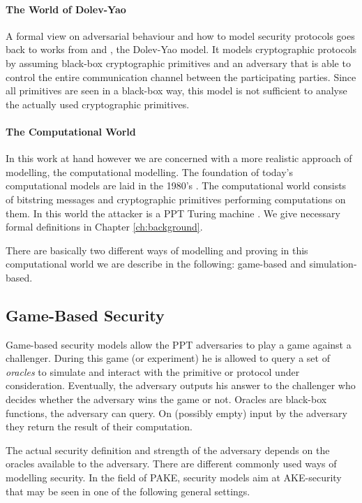 \paragraph{The World of Dolev-Yao}
A formal view on adversarial behaviour and how to model security protocols goes back to works from \citeauthor{Needham78} \citeyear{Needham78} \cite{Needham78} and \citeauthor{Dolev83} \citeyear{Dolev83} \cite{Dolev83}, the Dolev-Yao model. It models cryptographic protocols by assuming black-box cryptographic primitives and an adversary that is able to control the entire communication channel between the participating parties.
Since all primitives are seen in a black-box way, this model is not sufficient to analyse the actually used cryptographic primitives.

\paragraph{The Computational World}
In this work at hand however we are concerned with a more realistic approach of modelling, the computational modelling.
The foundation of today's computational models are laid in the 1980's \cite{Goldwasser82}.
The computational world consists of bitstring messages and cryptographic primitives performing computations on them.
In this world the attacker is a \ac{PPT} Turing machine \cite{Turing37}.
We give necessary formal definitions in Chapter \ref{ch:background}.

There are basically two different ways of modelling and proving in this computational world we are describe in the following: game-based and simulation-based.

\subsection{Game-Based Security}
Game-based security models allow the \ac{PPT} adversaries to play a game against a challenger.
During this game (or experiment) he is allowed to query a set of \emph{oracles} to simulate and interact with the primitive or protocol under consideration.
Eventually, the adversary outputs his answer to the challenger who decides whether the adversary wins the game or not.
Oracles are black-box functions, the adversary can query.
On (possibly empty) input by the adversary they return the result of their computation.

The actual security definition and strength of the adversary depends on the oracles available to the adversary.
There are different commonly used ways of modelling security.
In the field of \acl{PAKE}, security models aim at \ac{AKE}-security that may be seen in one of the following general settings.

